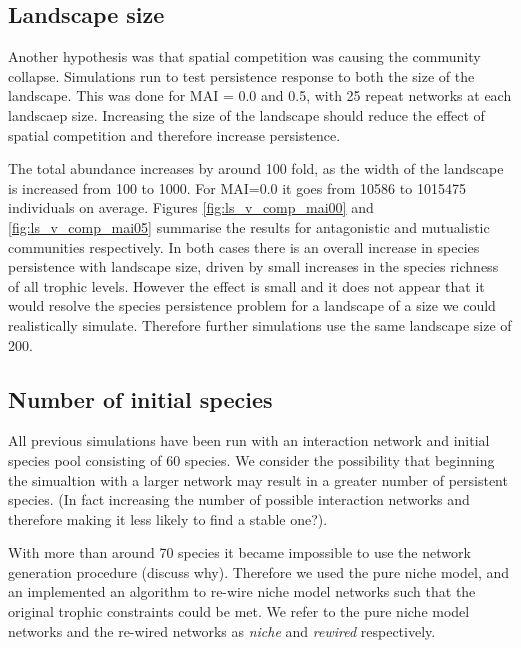 \newpage
\subsection{Landscape size}
\label{sec:lsvp}

Another hypothesis was that spatial competition was causing the community collapse. Simulations run to test persistence response to both the size of the landscape. This was done for MAI = 0.0 and 0.5, with 25 repeat networks at each landscaep size. Increasing the size of the landscape should reduce the effect of spatial competition and therefore increase persistence.  

The total abundance increases by around 100 fold, as the width of the landscape is increased from 100 to 1000. For MAI=0.0 it goes from 10586 to 1015475 individuals on average. Figures \ref{fig:ls_v_comp_mai00} and \ref{fig:ls_v_comp_mai05} summarise the results for antagonistic and mutualistic communities respectively. In both cases there is an overall increase in species persistence with landscape size, driven by small increases in the species richness of all trophic levels. However the effect is small and it does not appear that it would resolve the species persistence problem for a landscape of a size we could realistically simulate. Therefore further simulations use the same landscape size of 200.

\newpage
\subsection{Number of initial species}
\label{sec:numsp_vp}

All previous simulations have been run with an interaction network and initial species pool consisting of 60 species. We consider the possibility that beginning the simualtion with a larger network may result in a greater number of persistent species. (In fact increasing the number of possible interaction networks and therefore making it less likely to find a stable one?).
 
With more than around 70 species it became impossible to use the network generation procedure (discuss why). Therefore we used the pure niche model, and an implemented an algorithm to re-wire niche model networks such that the original trophic constraints could be met. We refer to the pure niche model networks and the re-wired networks as \emph{niche} and \emph{rewired} respectively. 


